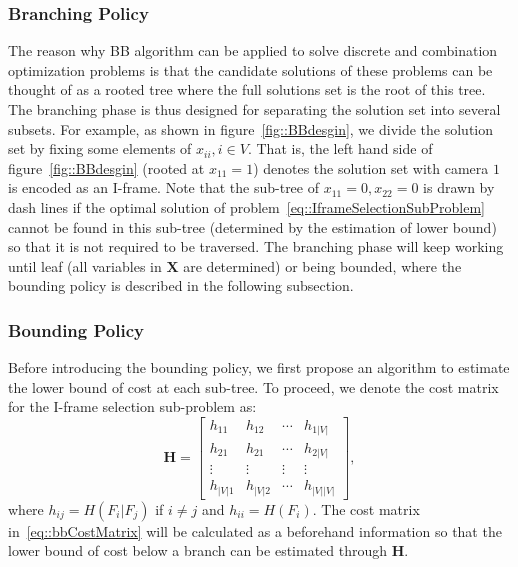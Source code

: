 \subsubsection{Branching Policy}
The reason why BB algorithm can be applied to solve discrete and combination optimization problems is that the candidate solutions of these problems can be thought of as a rooted tree where the full solutions set is the root of this tree.
The branching phase is thus designed for separating the solution set into several subsets.
For example, as shown in figure~\ref{fig::BBdesgin}, we divide the solution set by fixing some elements of ${x_{ii},i \in V}$.
That is, the left hand side of figure~\ref{fig::BBdesgin} (rooted at $x_{11}=1$) denotes the solution set with camera $1$ is encoded as an I-frame.
Note that the sub-tree of $x_{11}=0, x_{22}=0$ is drawn by dash lines if the optimal solution of problem~\eqref{eq::IframeSelectionSubProblem} cannot be found in this sub-tree (determined by the estimation of lower bound) so that it is not required to be traversed.
The branching phase will keep working until leaf (all variables in $\mathbf{X}$ are determined) or being bounded, where the bounding policy is described in the following subsection.
%
\subsubsection{Bounding Policy}
Before introducing the bounding policy, we first propose an algorithm to estimate the lower bound of cost at each sub-tree.
To proceed, we denote the cost matrix for the I-frame selection sub-problem as:
\begin{equation}
\mathbf{H} = \left[ \begin{array}{cccc}
h_{11} &h_{12} &\cdots &h_{1|V|} \\
h_{21} &h_{21} &\cdots &h_{2|V|} \\
\vdots &\vdots &\vdots &\vdots \\
h_{|V|1} &h_{|V|2} &\cdots &h_{|V||V|}
\end{array} \right],
\label{eq::bbCostMatrix}
\end{equation}
where ${h_{ij} = H(F_i|F_j)}$ if ${i \neq j}$ and ${h_{ii}=H(F_i)}$.
The cost matrix in~\eqref{eq::bbCostMatrix} will be calculated as a beforehand information so that the lower bound of cost below a branch can be estimated through $\mathbf{H}$.

